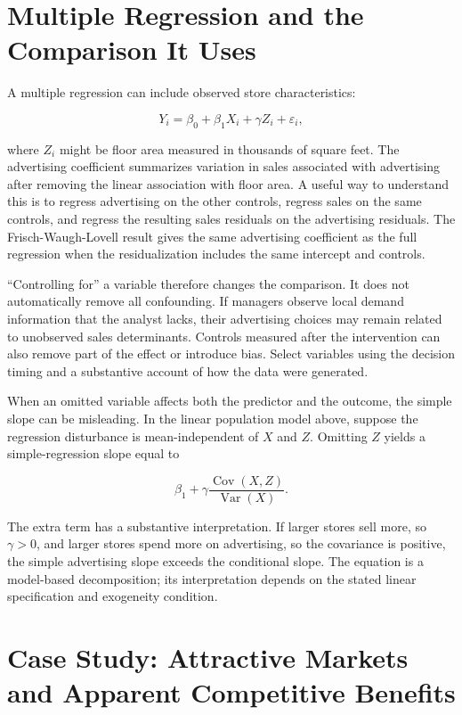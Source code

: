 \hypertarget{M03-multiple-regression-and-the-comparison-it-uses}{%
\section{Multiple Regression and the Comparison It
Uses}\label{M03-multiple-regression-and-the-comparison-it-uses}}

\noindent A multiple regression can include observed store characteristics:

\[
Y_i=\beta_0+\beta_1X_i+\gamma Z_i+\varepsilon_i,
\]

where \(Z_i\) might be floor area measured in thousands of square feet.
The advertising coefficient summarizes variation in sales associated
with advertising after removing the linear association with floor area.
A useful way to understand this is to regress advertising on the other
controls, regress sales on the same controls, and regress the resulting
sales residuals on the advertising residuals. The Frisch-Waugh-Lovell
result gives the same advertising coefficient as the full regression
when the residualization includes the same intercept and controls.

``Controlling for'' a variable therefore changes the comparison. It does
not automatically remove all confounding. If managers observe local
demand information that the analyst lacks, their advertising choices may
remain related to unobserved sales determinants. Controls measured after
the intervention can also remove part of the effect or introduce bias.
Select variables using the decision timing and a substantive account of
how the data were generated.

When an omitted variable affects both the predictor and the outcome, the
simple slope can be misleading. In the linear population model above,
suppose the regression disturbance is mean-independent of \(X\) and
\(Z\). Omitting \(Z\) yields a simple-regression slope equal to

\[
\beta_1+\gamma\frac{\operatorname{Cov}(X,Z)}{\operatorname{Var}(X)}.
\]

The extra term has a substantive interpretation. If larger stores sell
more, so \(\gamma>0\), and larger stores spend more on advertising, so
the covariance is positive, the simple advertising slope exceeds the
conditional slope. The equation is a model-based decomposition; its
interpretation depends on the stated linear specification and exogeneity
condition.

\hypertarget{M03-case-study-attractive-markets-and-apparent-competitive-benefits}{%
\section{Case Study: Attractive Markets and Apparent Competitive
Benefits}\label{M03-case-study-attractive-markets-and-apparent-competitive-benefits}}

